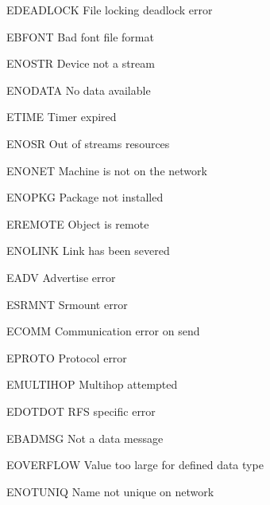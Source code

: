 \begin{datadesc}{EDEADLOCK} File locking deadlock error \end{datadesc}
\begin{datadesc}{EBFONT} Bad font file format \end{datadesc}
\begin{datadesc}{ENOSTR} Device not a stream \end{datadesc}
\begin{datadesc}{ENODATA} No data available \end{datadesc}
\begin{datadesc}{ETIME} Timer expired \end{datadesc}
\begin{datadesc}{ENOSR} Out of streams resources \end{datadesc}
\begin{datadesc}{ENONET} Machine is not on the network \end{datadesc}
\begin{datadesc}{ENOPKG} Package not installed \end{datadesc}
\begin{datadesc}{EREMOTE} Object is remote \end{datadesc}
\begin{datadesc}{ENOLINK} Link has been severed \end{datadesc}
\begin{datadesc}{EADV} Advertise error \end{datadesc}
\begin{datadesc}{ESRMNT} Srmount error \end{datadesc}
\begin{datadesc}{ECOMM} Communication error on send \end{datadesc}
\begin{datadesc}{EPROTO} Protocol error \end{datadesc}
\begin{datadesc}{EMULTIHOP} Multihop attempted \end{datadesc}
\begin{datadesc}{EDOTDOT} RFS specific error \end{datadesc}
\begin{datadesc}{EBADMSG} Not a data message \end{datadesc}
\begin{datadesc}{EOVERFLOW} Value too large for defined data type \end{datadesc}
\begin{datadesc}{ENOTUNIQ} Name not unique on network \end{datadesc}
